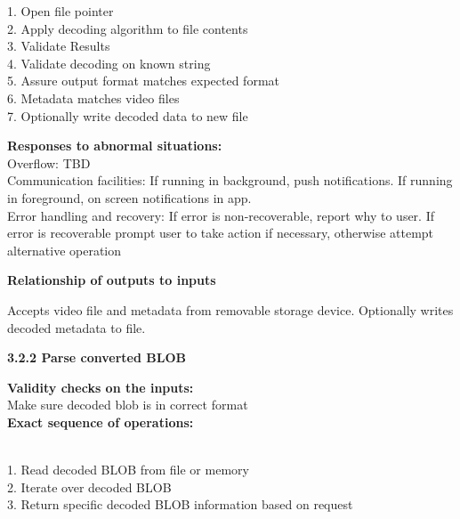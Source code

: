 \documentclass[10pt,draftclsnofoot,onecolumn]{IEEEtran}
\begin{document}
1. Open file pointer\\
2. Apply decoding algorithm to file contents\\
3. Validate Results\\
4. Validate decoding on known string\\
5. Assure output format matches expected format\\
6. Metadata matches video files\\
7. Optionally write decoded data to new file\\
 \vspace{2mm}

\textbf{Responses to abnormal situations:}\\
 \vspace{2mm}
 Overflow: TBD\\
 Communication facilities: If running in background, push notifications. If running in foreground, on screen notifications in app. \\
 Error handling and recovery: If error is non-recoverable, report why to user. If error is recoverable prompt user to take action if necessary, otherwise attempt alternative operation

 \vspace{2mm}
\textbf{Relationship of outputs to inputs }\\
 \vspace{2mm}

Accepts video file and metadata from removable storage device. Optionally writes decoded metadata to file. \\\vspace{5mm}

{\Medium\textbf{3.2.2 Parse converted BLOB}} \\
\vspace{5mm}

 
 \textbf{Validity checks on the inputs:}\\
Make sure decoded blob is in correct format\\
 \vspace{2mm}
\textbf{Exact sequence of operations: }\\\\
 \vspace{2mm}

1. Read decoded BLOB from file or memory\\
2. Iterate over decoded BLOB\\
3. Return specific decoded BLOB information based on request\\
\end{document}
